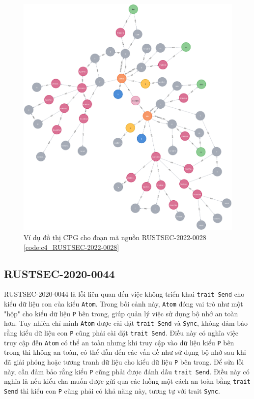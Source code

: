 \begin{figure}[H]
    \includegraphics[width=1\columnwidth]{figures/c4/c4_RUSTSEC-2022-0028.png}
    \centering
    \caption{Ví dụ đồ thị CPG cho đoạn mã nguồn RUSTSEC-2022-0028 \ref{code:c4_RUSTSEC-2022-0028}}
    \label{img:c4_RUSTSEC-2022-0028}
\end{figure}

\subsection{RUSTSEC-2020-0044}

RUSTSEC-2020-0044 là lỗi liên quan đến việc không triển khai \texttt{trait Send} cho kiểu dữ liệu con của kiểu \texttt{Atom}.
Trong bối cảnh này, \texttt{Atom} đóng vai trò như một "hộp" cho kiểu dữ liệu \texttt{P} bên trong, giúp quản lý việc sử dụng bộ nhớ an toàn hơn.
Tuy nhiên chỉ mình \texttt{Atom} được cài đặt \texttt{trait Send} và \texttt{Sync}, không đảm bảo rằng kiểu dữ liệu con \texttt{P} cũng phải cài đặt \texttt{trait Send}.
Điều này có nghĩa việc truy cập đến \texttt{Atom} có thể an toàn nhưng khi truy cập vào dữ liệu kiểu \texttt{P} bên trong thì không an toàn, có thể dẫn đến các vấn đề như sử dụng bộ nhớ sau khi đã giải phóng hoặc tương tranh dữ liệu cho kiểu dữ liệu \texttt{P} bên trong.
Để sửa lỗi này, cần đảm bảo rằng kiểu \texttt{P} cũng phải được đánh dấu \texttt{trait Send}.
Điều này có nghĩa là nếu kiểu cha muốn được gửi qua các luồng một cách an toàn bằng \texttt{trait Send} thì kiểu con \texttt{P} cũng phải có khả năng này, tương tự với trait \texttt{Sync}.


